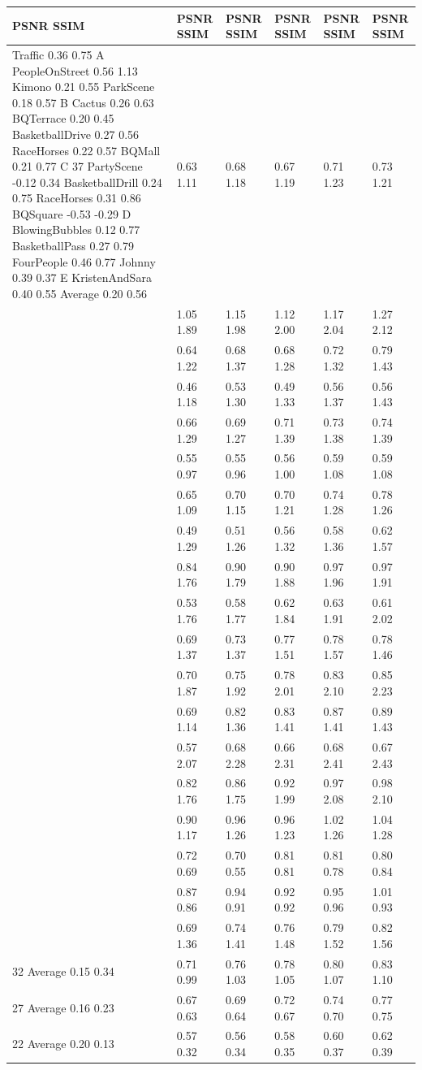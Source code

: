 \begin{tabular}{llllll}
\toprule
PSNR SSIM & PSNR SSIM & PSNR SSIM & PSNR SSIM & PSNR SSIM & PSNR SSIM \\
\midrule
Traffic 0.36 0.75 A PeopleOnStreet 0.56 1.13 Kimono 0.21 0.55 ParkScene 0.18 0.57 B Cactus 0.26 0.63 BQTerrace 0.20 0.45 BasketballDrive 0.27 0.56 RaceHorses 0.22 0.57 BQMall 0.21 0.77 C 37 PartyScene -0.12 0.34 BasketballDrill 0.24 0.75 RaceHorses 0.31 0.86 BQSquare -0.53 -0.29 D BlowingBubbles 0.12 0.77 BasketballPass 0.27 0.79 FourPeople 0.46 0.77 Johnny 0.39 0.37 E KristenAndSara 0.40 0.55 Average 0.20 0.56 & 0.63 1.11 & 0.68 1.18 & 0.67 1.19 & 0.71 1.23 & 0.73 1.21 \\
 & 1.05 1.89 & 1.15 1.98 & 1.12 2.00 & 1.17 2.04 & 1.27 2.12 \\
 & 0.64 1.22 & 0.68 1.37 & 0.68 1.28 & 0.72 1.32 & 0.79 1.43 \\
 & 0.46 1.18 & 0.53 1.30 & 0.49 1.33 & 0.56 1.37 & 0.56 1.43 \\
 & 0.66 1.29 & 0.69 1.27 & 0.71 1.39 & 0.73 1.38 & 0.74 1.39 \\
 & 0.55 0.97 & 0.55 0.96 & 0.56 1.00 & 0.59 1.08 & 0.59 1.08 \\
 & 0.65 1.09 & 0.70 1.15 & 0.70 1.21 & 0.74 1.28 & 0.78 1.26 \\
 & 0.49 1.29 & 0.51 1.26 & 0.56 1.32 & 0.58 1.36 & 0.62 1.57 \\
 & 0.84 1.76 & 0.90 1.79 & 0.90 1.88 & 0.97 1.96 & 0.97 1.91 \\
 & 0.53 1.76 & 0.58 1.77 & 0.62 1.84 & 0.63 1.91 & 0.61 2.02 \\
 & 0.69 1.37 & 0.73 1.37 & 0.77 1.51 & 0.78 1.57 & 0.78 1.46 \\
 & 0.70 1.87 & 0.75 1.92 & 0.78 2.01 & 0.83 2.10 & 0.85 2.23 \\
 & 0.69 1.14 & 0.82 1.36 & 0.83 1.41 & 0.87 1.41 & 0.89 1.43 \\
 & 0.57 2.07 & 0.68 2.28 & 0.66 2.31 & 0.68 2.41 & 0.67 2.43 \\
 & 0.82 1.76 & 0.86 1.75 & 0.92 1.99 & 0.97 2.08 & 0.98 2.10 \\
 & 0.90 1.17 & 0.96 1.26 & 0.96 1.23 & 1.02 1.26 & 1.04 1.28 \\
 & 0.72 0.69 & 0.70 0.55 & 0.81 0.81 & 0.81 0.78 & 0.80 0.84 \\
 & 0.87 0.86 & 0.94 0.91 & 0.92 0.92 & 0.95 0.96 & 1.01 0.93 \\
 & 0.69 1.36 & 0.74 1.41 & 0.76 1.48 & 0.79 1.52 & 0.82 1.56 \\
32 Average 0.15 0.34 & 0.71 0.99 & 0.76 1.03 & 0.78 1.05 & 0.80 1.07 & 0.83 1.10 \\
27 Average 0.16 0.23 & 0.67 0.63 & 0.69 0.64 & 0.72 0.67 & 0.74 0.70 & 0.77 0.75 \\
22 Average 0.20 0.13 & 0.57 0.32 & 0.56 0.34 & 0.58 0.35 & 0.60 0.37 & 0.62 0.39 \\
\bottomrule
\end{tabular}
